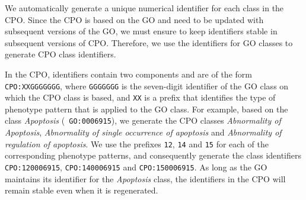 \documentclass[11pt]{article}
\begin{document}
We automatically generate a unique numerical identifier for each class
in the CPO.  Since the CPO is based on the GO and need to be updated
with subsequent versions of the GO, we must ensure to keep identifiers
stable in subsequent versions of CPO. Therefore, we use the
identifiers for GO classes to generate CPO class identifiers.

In the CPO, identifiers contain two components and are of the form
{\tt CPO:XXGGGGGGG}, where {\tt GGGGGGG} is the seven-digit identifier
of the GO class on which the CPO class is based, and {\tt XX} is a
prefix that identifies the type of phenotype pattern that is applied
to the GO class. For example, based on the class {\em Apoptosis} ({\tt
  GO:0006915}), we generate the CPO classes {\em Abnormality of
  Apoptosis}, {\em Abnormality of single occurrence of apoptosis} and
{\em Abnormality of regulation of apoptosis}.  We use the prefixes
{\tt 12}, {\tt 14} and {\tt 15} for each of the corresponding
phenotype patterns, and consequently generate the class identifiers
{\tt CPO:120006915}, {\tt CPO:140006915} and {\tt CPO:150006915}. As
long as the GO maintains its identifier for the {\em Apoptosis} class,
the identifiers in the CPO will remain stable even when it is
regenerated.
\end{document}
